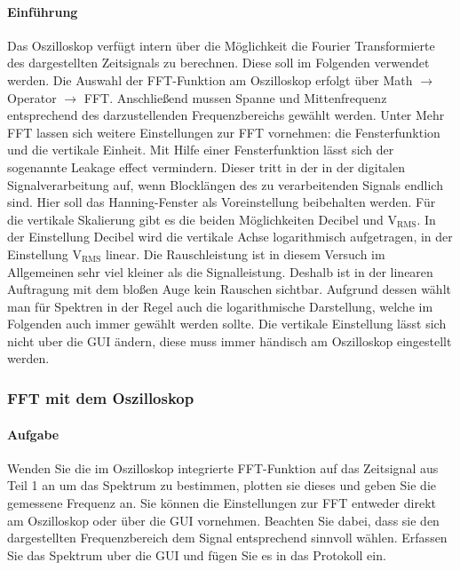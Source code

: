 \documentclass[10pt]{report}
\begin{document}
        \paragraph{Einführung}
        Das Oszilloskop verfügt intern über die Möglichkeit die Fourier Transformierte des dargestellten
        Zeitsignals zu berechnen. Diese soll im Folgenden verwendet werden.
        Die Auswahl der FFT-Funktion am Oszilloskop erfolgt über
        \glqq{}Math\grqq{} $\rightarrow$ \glqq{}Operator\grqq{} $\rightarrow$ \glqq{}FFT\grqq{}.
        Anschließend mussen Spanne und Mittenfrequenz entsprechend des darzustellenden Frequenzbereichs gewählt werden.
        Unter \glqq{} Mehr FFT\grqq{} lassen sich weitere Einstellungen
        zur FFT vornehmen: die Fensterfunktion und die vertikale Einheit.
        Mit Hilfe einer Fensterfunktion lässt sich der sogenannte \glqq{}Leakage effect\grqq{} vermindern.
        Dieser tritt in der in der digitalen Signalverarbeitung auf, wenn Blocklängen des zu verarbeitenden
        Signals endlich sind. Hier soll das \glqq{}Hanning-Fenster\grqq{} als Voreinstellung beibehalten
        werden.
        Für die vertikale Skalierung gibt es die beiden Möglichkeiten \glqq{}Decibel\grqq{} und
        \glqq{}$\text{V}_{\text{RMS}}$\grqq{}.
        In der Einstellung \glqq{}
        Decibel\grqq{} wird die vertikale Achse logarithmisch aufgetragen, in der
        Einstellung \glqq{}$\text{V}_{\text{RMS}}$\grqq{} linear. Die Rauschleistung ist in diesem Versuch im Allgemeinen sehr
        viel kleiner als die Signalleistung. Deshalb ist in der linearen Auftragung mit dem bloßen
        Auge kein Rauschen sichtbar. Aufgrund dessen wählt man für Spektren in der Regel auch
        die logarithmische Darstellung, welche im Folgenden auch immer gewählt werden sollte.
        Die vertikale Einstellung lässt sich nicht uber die GUI ändern, diese muss immer händisch
        am Oszilloskop eingestellt werden.
        \subsubsection{FFT mit dem Oszilloskop}
        \paragraph{Aufgabe}
        Wenden Sie die im Oszilloskop integrierte FFT-Funktion auf das Zeitsignal aus
        Teil 1 an um das Spektrum zu bestimmen, plotten sie dieses und geben Sie die
        gemessene Frequenz an. Sie können die Einstellungen zur FFT entweder direkt
        am Oszilloskop oder über die GUI vornehmen. Beachten Sie dabei, dass sie den
        dargestellten Frequenzbereich dem Signal entsprechend sinnvoll wählen. Erfassen
        Sie das Spektrum uber die GUI und fügen Sie es in das Protokoll ein.
\end{document}
